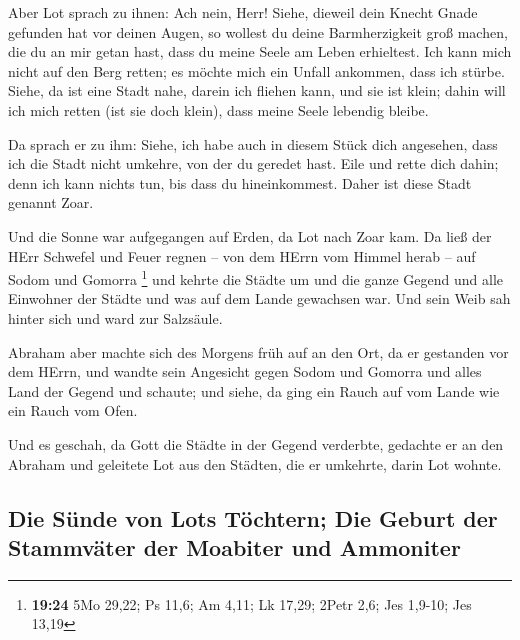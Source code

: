  Aber Lot sprach zu ihnen: Ach nein, Herr!
 Siehe, dieweil dein Knecht Gnade gefunden hat vor deinen
Augen, so wollest du deine Barmherzigkeit groß machen, die du an mir
getan hast, dass du meine Seele am Leben erhieltest. Ich kann mich nicht
auf den Berg retten; es möchte mich ein Unfall ankommen, dass ich
stürbe.  Siehe, da ist eine Stadt nahe, darein ich
fliehen kann, und sie ist klein; dahin will ich mich retten (ist sie
doch klein), dass meine Seele lebendig bleibe.

 Da sprach er zu ihm: Siehe, ich habe auch in diesem
Stück dich angesehen, dass ich die Stadt nicht umkehre, von der du
geredet hast.  Eile und rette dich dahin; denn ich kann
nichts tun, bis dass du hineinkommest. Daher ist diese Stadt genannt
Zoar.

 Und die Sonne war aufgegangen auf Erden, da Lot nach
Zoar kam.  Da ließ der HErr Schwefel und Feuer regnen --
von dem HErrn vom Himmel herab -- auf Sodom und Gomorra \footnote{\textbf{19:24}
  5Mo 29,22; Ps 11,6; Am 4,11; Lk 17,29; 2Petr 2,6; Jes 1,9-10; Jes
  13,19}  und kehrte die Städte um und die ganze Gegend
und alle Einwohner der Städte und was auf dem Lande gewachsen war.
 Und sein Weib sah hinter sich und ward zur Salzsäule.

 Abraham aber machte sich des Morgens früh auf an den
Ort, da er gestanden vor dem HErrn,  und wandte sein
Angesicht gegen Sodom und Gomorra und alles Land der Gegend und schaute;
und siehe, da ging ein Rauch auf vom Lande wie ein Rauch vom Ofen.

 Und es geschah, da Gott die Städte in der Gegend
verderbte, gedachte er an den Abraham und geleitete Lot aus den Städten,
die er umkehrte, darin Lot wohnte.

\hypertarget{die-suxfcnde-von-lots-tuxf6chtern-die-geburt-der-stammvuxe4ter-der-moabiter-und-ammoniter}{%
\subsection{Die Sünde von Lots Töchtern; Die Geburt der Stammväter der
Moabiter und
Ammoniter}\label{die-suxfcnde-von-lots-tuxf6chtern-die-geburt-der-stammvuxe4ter-der-moabiter-und-ammoniter}}

